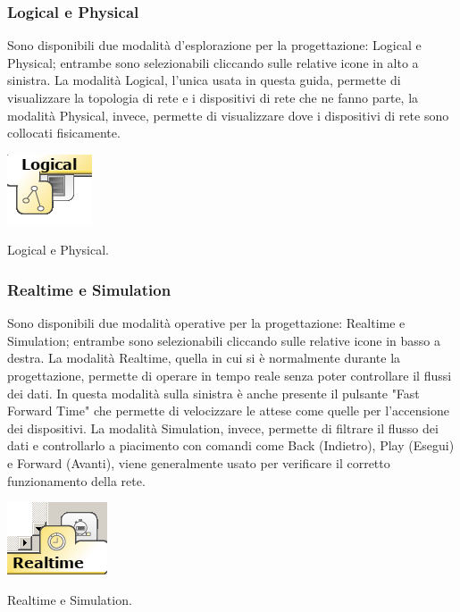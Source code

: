 \subsubsection{Logical e Physical}
Sono disponibili due modalità d'esplorazione per la progettazione: Logical e Physical; entrambe sono selezionabili cliccando sulle relative icone in alto a sinistra. La modalità Logical, l'unica usata in questa guida, permette di visualizzare la topologia di rete e i dispositivi di rete che ne fanno parte, la modalità Physical, invece, permette di visualizzare dove i dispositivi di rete sono collocati fisicamente.

\begin{sfigure}
    \centering
    \captionsetup{type=figure}
    \includegraphics[scale=.6]{images/02.packet-tracer/logical_physical.png}
    \caption{Logical e Physical.}
\end{sfigure}

\subsubsection{Realtime e Simulation}
Sono disponibili due modalità operative per la progettazione: Realtime e Simulation; entrambe sono selezionabili cliccando sulle relative icone in basso a destra. La modalità Realtime, quella in cui si è normalmente durante la progettazione, permette di operare in tempo reale senza poter controllare il flussi dei dati. In questa modalità sulla sinistra è anche presente il pulsante "Fast Forward Time" che permette di velocizzare le attese come quelle per l'accensione dei dispositivi. La modalità Simulation, invece, permette di filtrare il flusso dei dati e controllarlo a piacimento con comandi come Back (Indietro), Play (Esegui) e Forward (Avanti), viene generalmente usato per verificare il corretto funzionamento della rete. 

\begin{sfigure}
    \centering
    \captionsetup{type=figure}
    \includegraphics[scale=.5]{images/02.packet-tracer/realtime_simulation.png}
    \caption{Realtime e Simulation.}
\end{sfigure}

